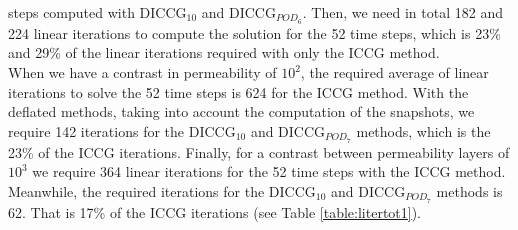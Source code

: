 \documentclass[review]{elsarticle}
\begin{document}
steps computed with DICCG$_{10}$ and DICCG$_{POD_6}$. Then, we need in total 182 and 224 linear iterations to compute the 
solution for the 52 time steps, which is 23\% and 29\% of the linear iterations required with only the ICCG method.\\
When we have a contrast in permeability of $10^{2}$, the required average of linear iterations to solve the 52 
time steps is 624 for the ICCG method. With the deflated methods, taking into account the computation of the snapshots, we require 
142 iterations for the DICCG$_{10}$ and  DICCG$_{POD_7}$ methods, which is the 23\% of the ICCG iterations. 
Finally, for a contrast between permeability layers of $10^{3}$ we require 364 linear iterations for the 52 time steps 
with the ICCG method. Meanwhile, the required iterations for the DICCG$_{10}$ and DICCG$_{POD_7}$ methods is 62. 
That is 17\% of the ICCG iterations (see Table \ref{table:litertot1}).\\
\end{document}
